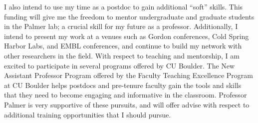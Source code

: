\documentclass{F32}
\begin{document}

I also intend to use my time as a postdoc to gain additional ``soft'' skills. This funding will give me the freedom to mentor undergraduate and graduate students in the Palmer lab; a crucial skill for my future as a professor. Additionally, I intend to present my work at a venues such as Gordon conferences, Cold Spring Harbor Labs, and EMBL conferences, and continue to build my network with other researchers in the field. With respect to teaching and mentorship, I am excited to participate in several programs offered by CU Boulder. The New Assistant Professor Program offered by the Faculty Teaching Excellence Program at CU Boulder helps postdocs and pre-tenure faculty gain the tools and skills that they need to become engaging and informative in the classroom.  Professor Palmer is very supportive of these pursuits, and will offer advise with respect to additional training opportunities that I should pursue.

\end{document}
